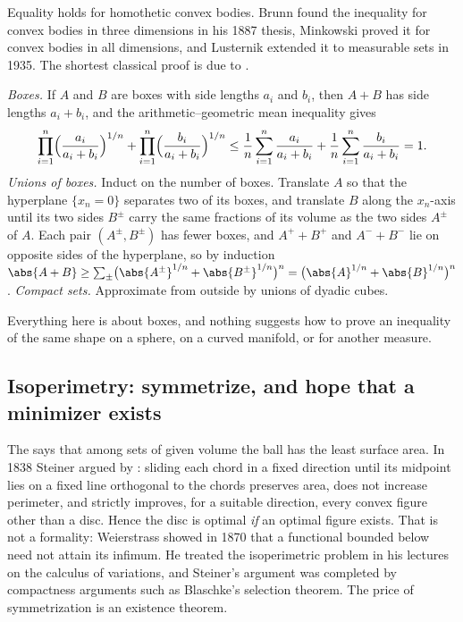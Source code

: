 \begin{refsection}
Equality holds for homothetic convex bodies. Brunn found the inequality for convex bodies in three dimensions in his 1887 thesis, Minkowski proved it for convex bodies in all dimensions, and Lusternik extended it to measurable sets in 1935. The shortest classical proof is due to \textcite{HadwigerOhmann1956}.

\begin{aside}
\emph{Boxes.} If $A$ and $B$ are boxes with side lengths $a_i$ and $b_i$, then $A+B$ has side lengths $a_i+b_i$, and the arithmetic--geometric mean inequality gives
\[
\prod_{i=1}^n\Bigl(\frac{a_i}{a_i+b_i}\Bigr)^{1/n}+\prod_{i=1}^n\Bigl(\frac{b_i}{a_i+b_i}\Bigr)^{1/n}\le\frac1n\sum_{i=1}^n\frac{a_i}{a_i+b_i}+\frac1n\sum_{i=1}^n\frac{b_i}{a_i+b_i}=1.
\]
\emph{Unions of boxes.} Induct on the number of boxes. Translate $A$ so that the hyperplane $\{x_n=0\}$ separates two of its boxes, and translate $B$ along the $x_n$-axis until its two sides $B^\pm$ carry the same fractions of its volume as the two sides $A^\pm$ of $A$. Each pair $(A^\pm,B^\pm)$ has fewer boxes, and $A^++B^+$ and $A^-+B^-$ lie on opposite sides of the hyperplane, so by induction $\abs{A+B}\ge\sum_\pm\bigl(\abs{A^\pm}^{1/n}+\abs{B^\pm}^{1/n}\bigr)^n=\bigl(\abs{A}^{1/n}+\abs{B}^{1/n}\bigr)^n$.
\emph{Compact sets.} Approximate from outside by unions of dyadic cubes.
\end{aside}

Everything here is about boxes, and nothing suggests how to prove an inequality of the same shape on a sphere, on a curved manifold, or for another measure.

\subsection{Isoperimetry: symmetrize, and hope that a minimizer exists}\label{sec:transport:isobefore}

The  says that among sets of given volume the ball has the least surface area. In 1838 Steiner argued by : sliding each chord in a fixed direction until its midpoint lies on a fixed line orthogonal to the chords preserves area, does not increase perimeter, and strictly improves, for a suitable direction, every convex figure other than a disc. Hence the disc is optimal \emph{if} an optimal figure exists. That is not a formality: Weierstrass showed in 1870 that a functional bounded below need not attain its infimum. He treated the isoperimetric problem in his lectures on the calculus of variations, and Steiner's argument was completed by compactness arguments such as Blaschke's selection theorem. The price of symmetrization is an existence theorem.


\end{refsection}

